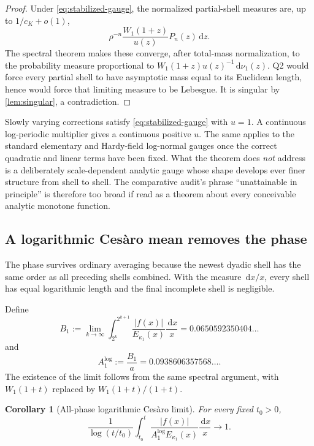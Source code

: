 \documentclass[11pt,oneside]{article}
\newtheorem{corollary}[theorem]{Corollary}
\theoremstyle{definition}
\theoremstyle{remark}
\newcommand{\dd}{\,\mathrm d}
\begin{document}
\begin{proof}
Under \eqref{eq:stabilized-gauge}, the normalized partial-shell measures are,
up to $1/c_K+o(1)$,
\[
 \rho^{-n}\frac{W_1(1+z)}{u(z)}P_n(z)\dd z.
\]
The spectral theorem makes these converge, after total-mass normalization, to
the probability measure proportional to
$W_1(1+z)u(z)^{-1}\dd\nu_1(z)$.  Q2 would force every partial shell to have
asymptotic mass equal to its Euclidean length, hence would force that limiting
measure to be Lebesgue.  It is singular by \cref{lem:singular}, a
contradiction.
\end{proof}

Slowly varying corrections satisfy \eqref{eq:stabilized-gauge} with $u=1$.
A continuous log-periodic multiplier gives a continuous positive $u$.  The
same applies to the standard elementary and Hardy-field log-normal gauges once
the correct quadratic and linear terms have been fixed.  What the theorem
does \emph{not} address is a deliberately scale-dependent analytic gauge whose
shape develops ever finer structure from shell to shell.  The comparative
audit's phrase ``unattainable in principle'' is therefore too broad if read as
a theorem about every conceivable analytic monotone function.

\subsection{A logarithmic Ces\`aro mean removes the phase}

The phase survives ordinary averaging because the newest dyadic shell has the
same order as all preceding shells combined.  With the measure $\dd x/x$,
every shell has equal logarithmic length and the final incomplete shell is
negligible.

Define
\begin{equation}
 B_1:=\lim_{k\to\infty}
 \int_{2^k}^{2^{k+1}}
 \frac{|f(x)|}{E_{\kappa_1}(x)}\frac{\dd x}{x}
 =0.0650592350404\ldots
 \label{eq:B1log}
\end{equation}
and
\begin{equation}
 A_1^{\log}:=\frac{B_1}{a}
 =0.0938606357568\ldots .
 \label{eq:A1log}
\end{equation}
The existence of the limit follows from the same spectral argument, with
$W_1(1+t)$ replaced by $W_1(1+t)/(1+t)$.

\begin{corollary}[All-phase logarithmic Ces\`aro limit]
\label{cor:log-Cesaro}
For every fixed $t_0>0$,
\begin{equation}
 \frac1{\log(t/t_0)}
 \int_{t_0}^{t}
 \frac{|f(x)|}{A_1^{\log}E_{\kappa_1}(x)}\frac{\dd x}{x}
 \longrightarrow1.
 \label{eq:log-Cesaro}
\end{equation}
\end{corollary}
\end{document}
